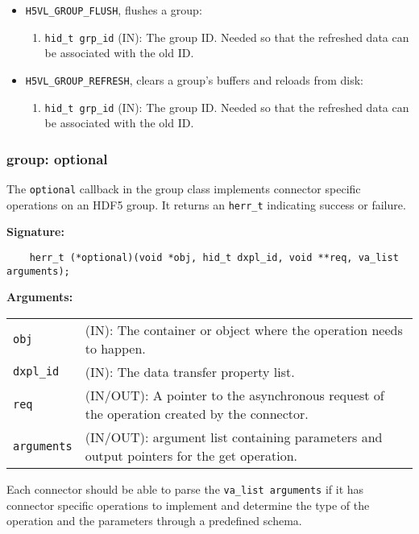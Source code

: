 \begin{itemize}
\item \texttt{H5VL\_GROUP\_FLUSH}, flushes a group:
  \begin{enumerate}
  \item \texttt{hid\_t grp\_id} (IN): The group ID. Needed so that the refreshed data can be associated with the old ID. 
  \end{enumerate}
\item \texttt{H5VL\_GROUP\_REFRESH}, clears a group's buffers and reloads from disk:
  \begin{enumerate}
  \item \texttt{hid\_t grp\_id} (IN): The group ID. Needed so that the refreshed data can be associated with the old ID. 
  \end{enumerate}
\end{itemize}

\subsubsection{group: optional}
The \texttt{optional} callback in the group class implements connector specific operations on an HDF5 group. It returns an \texttt{herr\_t} indicating success or failure. \bigskip

\begin{mdframed}[style=bgbox]
\textbf{Signature:}
\begin{lstlisting}
    herr_t (*optional)(void *obj, hid_t dxpl_id, void **req, va_list arguments);
\end{lstlisting}

\textbf{Arguments:}\\
\begin{tabular}{l p{13.5cm}}
  \texttt{obj} & (IN): The container or object where the operation needs to happen.\\
  \texttt{dxpl\_id} & (IN): The data transfer property list.\\
  \texttt{req} & (IN/OUT): A pointer to the asynchronous request of the operation created by the connector.\\
  \texttt{arguments} & (IN/OUT): argument list containing parameters and output pointers for the get operation. \\
\end{tabular}
\end{mdframed}

Each connector should be able to parse the \texttt{va\_list arguments} if it has connector specific operations to implement and determine the type of the operation and the parameters through a predefined schema. 

